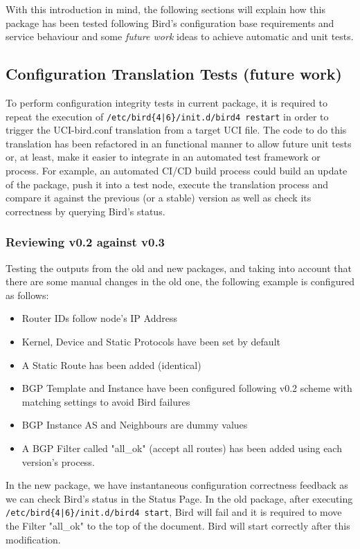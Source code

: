 With this introduction in mind, the following sections will explain how this package has been tested following Bird's configuration base requirements and service behaviour and some \textit{future work} ideas to achieve automatic and unit tests.


\subsection{Configuration Translation Tests (future work)}
To perform configuration integrity tests in current package, it is required to repeat the execution of \texttt{/etc/bird\{4|6\}/init.d/bird4 restart} in order to trigger the UCI-bird.conf translation from a target UCI file. The code to do this translation has been refactored in an functional manner to allow future unit tests or, at least, make it easier to integrate in an automated test framework or process. For example, an automated CI/CD build process could build an update of the package, push it into a test node, execute the translation process and compare it against the previous (or a stable) version as well as check its correctness by querying Bird's status.

\subsubsection{Reviewing v0.2 against v0.3}
Testing the outputs from the old and new packages, and taking into account that there are some manual changes in the old one, the following example is configured as follows:

\begin{itemize}
    \item Router IDs follow node's IP Address
    \item Kernel, Device and Static Protocols have been set by default
    \item A Static Route has been added  (identical)
    \item BGP Template and Instance have been configured following v0.2 scheme with matching settings to avoid Bird failures
    \item BGP Instance AS and Neighbours are dummy values
    \item A BGP Filter called "all\_ok" (accept all routes) has been added using each version's process.
\end{itemize}

In the new package, we have instantaneous configuration correctness feedback as we can check Bird's status in the Status Page. 
In the old package, after executing \texttt{/etc/bird\{4|6\}/init.d/bird4 start}, Bird will fail and it is required to move the Filter "all\_ok" to the top of the document. Bird will start correctly after this modification.

